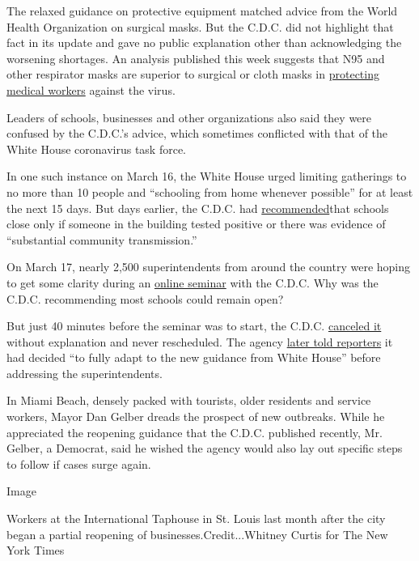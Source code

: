 The relaxed guidance on protective equipment matched advice from the
World Health Organization on surgical masks. But the C.D.C. did not
highlight that fact in its update and gave no public explanation other
than acknowledging the worsening shortages. An analysis published this
week suggests that N95 and other respirator masks are superior to
surgical or cloth masks in
\href{https://www.nytimes3xbfgragh.onion/2020/06/01/health/masks-surgical-N95-coronavirus.html}{protecting
medical workers} against the virus.

Leaders of schools, businesses and other organizations also said they
were confused by the C.D.C.'s advice, which sometimes conflicted with
that of the White House coronavirus task force.

In one such instance on March 16, the White House urged limiting
gatherings to no more than 10 people and ``schooling from home whenever
possible'' for at least the next 15 days. But days earlier, the C.D.C.
had
\href{https://www.cdc.gov/coronavirus/2019-ncov/community/schools-childcare/guidance-for-schools.html}{recommended}that
schools close only if someone in the building tested positive or there
was evidence of ``substantial community transmission.''

On March 17, nearly 2,500 superintendents from around the country were
hoping to get some clarity during an
\href{https://www.aasa.org/content.aspx?id=44539}{online seminar} with
the C.D.C. Why was the C.D.C. recommending most schools could remain
open?

But just 40 minutes before the seminar was to start, the C.D.C.
\href{https://www.documentcloud.org/documents/6933965-2020-03-17-Superintendents-Briefing.html}{canceled
it} without explanation and never rescheduled. The agency
\href{https://www.npr.org/2020/03/18/817606520/coronavirus-closes-schools-its-unclear-when-students-will-return}{later
told reporters} it had decided ``to fully adapt to the new guidance from
White House'' before addressing the superintendents.

In Miami Beach, densely packed with tourists, older residents and
service workers, Mayor Dan Gelber dreads the prospect of new outbreaks.
While he appreciated the reopening guidance that the C.D.C. published
recently, Mr. Gelber, a Democrat, said he wished the agency would also
lay out specific steps to follow if cases surge again.

Image

Workers at the International Taphouse in St. Louis last month after the
city began a partial reopening of businesses.Credit...Whitney Curtis for
The New York Times

